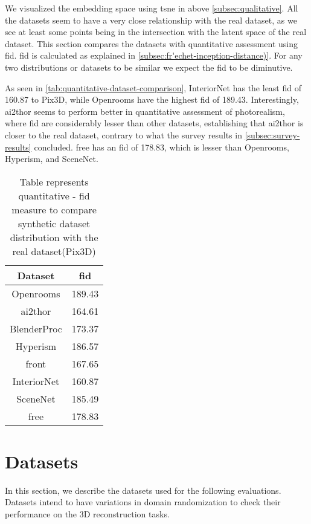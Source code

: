 We visualized the embedding space using \gls{tsne} in above \autoref{subsec:qualitative}.
All the datasets seem to have a very close relationship with the real dataset, as we see at least some points being in the intersection with the latent space of the real dataset.
This section compares the datasets with quantitative assessment using \gls{fid}.
\gls{fid} is calculated as explained in \autoref{subsec:fr'echet-inception-distance)}.
For any two distributions or datasets to be similar we expect the \gls{fid} to be diminutive.

As seen in \autoref{tab:quantitative-dataset-comparison}, InteriorNet has the least \gls{fid} of 160.87 to Pix3D, while Openrooms have the highest \gls{fid} of 189.43.
Interestingly, \gls{ai2thor} seems to perform better in quantitative assessment of photorealism,
where \gls{fid} are considerably lesser than other datasets,
establishing that \gls{ai2thor} is closer to the real dataset, contrary to what the survey results in \autoref{subsec:survey-results} concluded.
\gls{free} has an \gls{fid} of 178.83, which is lesser than Openrooms, Hyperism, and SceneNet.

\begin{table}[ht]
    \centering
    \begin{tabular}{|c |c |}
        \hline
        Dataset & \gls{fid} \\ [0.5ex]
        \hline\hline
        Openrooms & 189.43 \\
        \hline
        \gls{ai2thor} & 164.61 \\
        \hline
        BlenderProc  & 173.37 \\
        \hline
        Hyperism  & 186.57 \\
        \hline
        \gls{front}  & 167.65 \\
        \hline
        InteriorNet  & 160.87 \\
        \hline
        SceneNet & 185.49 \\
        \hline
        \gls{free} & 178.83 \\[1ex]
        \hline
    \end{tabular}
    \caption{Table represents quantitative - \gls{fid} measure to compare synthetic dataset distribution with the real dataset(Pix3D)}
    \label{tab:quantitative-dataset-comparison}
\end{table}

\section{Datasets}\label{sec:datasets}
In this section, we describe the datasets used for the following evaluations.
Datasets intend to have variations in domain randomization to check their performance on the 3D reconstruction tasks.

